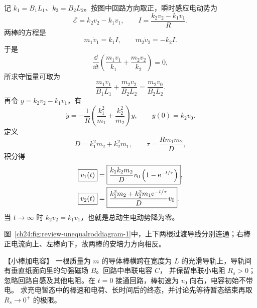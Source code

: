 {\begin{xesolution}
记 $k_1=B_1L_1$、$k_2=B_2L_2$。按图中回路方向取正，瞬时感应电动势为
\begin{equation}
  \mathcal E=k_2v_2-k_1v_1,
  \qquad I=\frac{k_2v_2-k_1v_1}{R}.
\end{equation}
两棒的方程是
\begin{equation}
  m_1\dot v_1=k_1I,
  \qquad m_2\dot v_2=-k_2I.
\end{equation}
于是
\begin{equation}
  \frac{\dd}{\dd t}\left(\frac{m_1v_1}{k_1}+\frac{m_2v_2}{k_2}\right)=0,
\end{equation}
所求守恒量可取为
\begin{equation}
  \boxed{\frac{m_1v_1}{B_1L_1}+\frac{m_2v_2}{B_2L_2}
  =\frac{m_2v_0}{B_2L_2}}.
\end{equation}
再令 $y=k_2v_2-k_1v_1$，有
\begin{equation}
  \dot y=-\frac1R\left(\frac{k_1^2}{m_1}+\frac{k_2^2}{m_2}\right)y,
  \qquad
  y(0)=k_2v_0.
\end{equation}
定义
\begin{equation}
  D=k_1^2m_2+k_2^2m_1,
  \qquad \tau=\frac{Rm_1m_2}{D},
\end{equation}
积分得
\begin{align}
  \boxed{v_1(t)}&=\boxed{\frac{k_1k_2m_2}{D}v_0\left(1-\mathrm e^{-t/\tau}\right)},\\
  \boxed{v_2(t)}&=\boxed{\frac{k_1^2m_2+k_2^2m_1\mathrm e^{-t/\tau}}{D}v_0}.
\end{align}
当 $t\to\infty$ 时 $k_2v_2=k_1v_1$，也就是总动生电动势降为零。

图~\ref{ch24:fig:review-unequalroddiagram-1}中，上下两根过渡导线分别连通；右棒正电流向上、左棒向下，故两棒的安培力方向相反。
\par\noindent\begin{minipage}{\linewidth}
\unequalRodDiagram
{}
\end{minipage}\par\medskip
\end{xesolution}



\begin{origexamplebox}{【小棒加电容】}\label{ch24:ex:s40-9-6}
一根质量为 $m$ 的导体棒横跨在宽度为 $L$ 的光滑导轨上，导轨间有垂直纸面向里的匀强磁场 $B$。回路中串联电容 $C$，
并保留串联小电阻 $R_s>0$；忽略回路自感及其他电阻。在 $t=0$ 接通回路，棒初速为 $v_0$ 向右，电容初始不带电。
求充电暂态中的棒速和电荷、长时间后的终态，并讨论先等待暂态结束再取 $R_s\to0^+$ 的极限。


\end{origexamplebox}}

